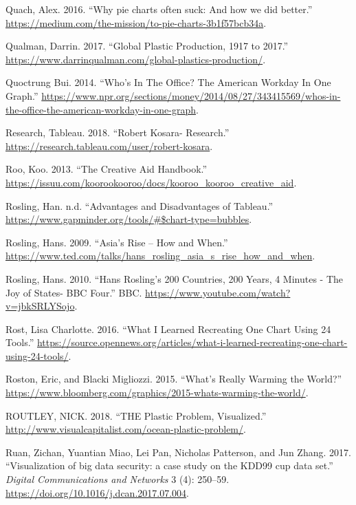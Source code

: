 \documentclass[]{book}
\begin{document}
\leavevmode\hypertarget{ref-quach-penny}{}%
Quach, Alex. 2016. ``Why pie charts often suck: And how we did better.'' \url{https://medium.com/the-mission/to-pie-charts-3b1f57bcb34a}.

\leavevmode\hypertarget{ref-global_plastic_production}{}%
Qualman, Darrin. 2017. ``Global Plastic Production, 1917 to 2017.'' \url{https://www.darrinqualman.com/global-plastics-production/}.

\leavevmode\hypertarget{ref-NPR_workday}{}%
Quoctrung Bui. 2014. ``Who's In The Office? The American Workday In One Graph.'' \url{https://www.npr.org/sections/money/2014/08/27/343415569/whos-in-the-office-the-american-workday-in-one-graph}.

\leavevmode\hypertarget{ref-research_viz}{}%
Research, Tableau. 2018. ``Robert Kosara- Research.'' \url{https://research.tableau.com/user/robert-kosara}.

\leavevmode\hypertarget{ref-creative_aid_handbook}{}%
Roo, Koo. 2013. ``The Creative Aid Handbook.'' \url{https://issuu.com/koorookooroo/docs/kooroo_kooroo_creative_aid}.

\leavevmode\hypertarget{ref-han_rosling_teaching}{}%
Rosling, Han. n.d. ``Advantages and Disadvantages of Tableau.'' \url{https://www.gapminder.org/tools/\#$chart-type=bubbles}.

\leavevmode\hypertarget{ref-hans}{}%
Rosling, Hans. 2009. ``Asia's Rise -- How and When.'' \url{https://www.ted.com/talks/hans_rosling_asia_s_rise_how_and_when}.

\leavevmode\hypertarget{ref-hans_rosling}{}%
Rosling, Hans. 2010. ``Hans Rosling's 200 Countries, 200 Years, 4 Minutes - The Joy of States- BBC Four.'' BBC. \url{https://www.youtube.com/watch?v=jbkSRLYSojo}.

\leavevmode\hypertarget{ref-different_tools}{}%
Rost, Lisa Charlotte. 2016. ``What I Learned Recreating One Chart Using 24 Tools.'' \url{https://source.opennews.org/articles/what-i-learned-recreating-one-chart-using-24-tools/}.

\leavevmode\hypertarget{ref-world_warming}{}%
Roston, Eric, and Blacki Migliozzi. 2015. ``What's Really Warming the World?'' \url{https://www.bloomberg.com/graphics/2015-whats-warming-the-world/}.

\leavevmode\hypertarget{ref-plastic_pollution_infographics}{}%
ROUTLEY, NICK. 2018. ``THE Plastic Problem, Visualized.'' \url{http://www.visualcapitalist.com/ocean-plastic-problem/}.

\leavevmode\hypertarget{ref-gapminder}{}%
Ruan, Zichan, Yuantian Miao, Lei Pan, Nicholas Patterson, and Jun Zhang. 2017. ``Visualization of big data security: a case study on the KDD99 cup data set.'' \emph{Digital Communications and Networks} 3 (4): 250--59. \url{https://doi.org/10.1016/j.dcan.2017.07.004}.
\end{document}
